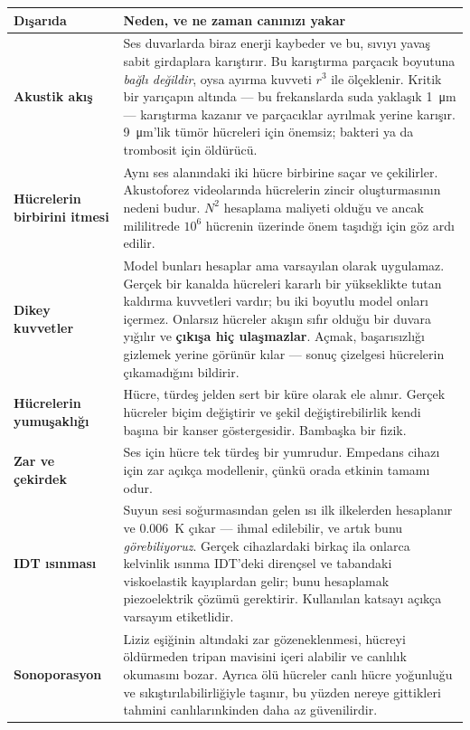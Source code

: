 \documentclass[11pt,a4paper]{article}
\begin{document}
\begin{center}\small
\begin{tabular}{p{4.2cm}p{10.2cm}}
\toprule
\textbf{Dışarıda} & \textbf{Neden, ve ne zaman canınızı yakar} \\
\midrule
\textbf{Akustik akış} &
Ses duvarlarda biraz enerji kaybeder ve bu, sıvıyı yavaş sabit girdaplara
karıştırır. Bu karıştırma parçacık boyutuna \emph{bağlı değildir}, oysa ayırma
kuvveti $r^3$ ile ölçeklenir. Kritik bir yarıçapın altında --- bu frekanslarda
suda yaklaşık \SI{1}{\micro\meter} --- karıştırma kazanır ve parçacıklar
ayrılmak yerine karışır. \SI{9}{\micro\meter}'lik tümör hücreleri için önemsiz;
bakteri ya da trombosit için öldürücü. \\[4pt]
\textbf{Hücrelerin birbirini itmesi} &
Aynı ses alanındaki iki hücre birbirine saçar ve çekilirler. Akustoforez
videolarında hücrelerin zincir oluşturmasının nedeni budur. $N^2$ hesaplama
maliyeti olduğu ve ancak mililitrede $10^6$ hücrenin üzerinde önem taşıdığı için
göz ardı edilir. \\[4pt]
\textbf{Dikey kuvvetler} &
Model bunları hesaplar ama varsayılan olarak uygulamaz. Gerçek bir kanalda
hücreleri kararlı bir yükseklikte tutan kaldırma kuvvetleri vardır; bu iki
boyutlu model onları içermez. Onlarsız hücreler akışın sıfır olduğu bir duvara
yığılır ve \textbf{çıkışa hiç ulaşmazlar}. Açmak, başarısızlığı gizlemek yerine
görünür kılar --- sonuç çizelgesi hücrelerin çıkamadığını bildirir. \\[4pt]
\textbf{Hücrelerin yumuşaklığı} &
Hücre, türdeş jelden sert bir küre olarak ele alınır. Gerçek hücreler biçim
değiştirir ve şekil değiştirebilirlik kendi başına bir kanser göstergesidir.
Bambaşka bir fizik. \\[4pt]
\textbf{Zar ve çekirdek} &
Ses için hücre tek türdeş bir yumrudur. Empedans cihazı için zar açıkça
modellenir, çünkü orada etkinin tamamı odur. \\[4pt]
\textbf{IDT ısınması} &
Suyun sesi soğurmasından gelen ısı ilk ilkelerden hesaplanır ve
\SI{0,006}{\kelvin} çıkar --- ihmal edilebilir, ve artık bunu \emph{görebiliyoruz}.
Gerçek cihazlardaki birkaç ila onlarca kelvinlik ısınma IDT'deki dirençsel ve
tabandaki viskoelastik kayıplardan gelir; bunu hesaplamak piezoelektrik çözümü
gerektirir. Kullanılan katsayı açıkça varsayım etiketlidir. \\[4pt]
\textbf{Sonoporasyon} &
Liziz eşiğinin altındaki zar gözeneklenmesi, hücreyi öldürmeden tripan mavisini
içeri alabilir ve canlılık okumasını bozar. Ayrıca ölü hücreler canlı hücre
yoğunluğu ve sıkıştırılabilirliğiyle taşınır, bu yüzden nereye gittikleri
tahmini canlılarınkinden daha az güvenilirdir. \\
\bottomrule
\end{tabular}
\end{center}
\end{document}
